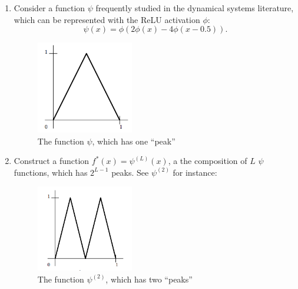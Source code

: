 \begin{enumerate}
\item
Consider a function $\psi$ frequently studied in the dynamical systems literature,
which can be represented with the ReLU activation $\phi$:
\[
\psi(x)=\phi(2\phi(x) - 4\phi(x-0.5)).
\]
\begin{figure}[H]
\centering
\includegraphics[width=0.4\textwidth]{Seventh_lecture/f_2.png}
\caption{The function $\psi$, which has one ``peak''}
\end{figure}
\item
Construct a function $f^*(x) = \psi^{(L)}(x)$, a the composition of $L$ $\psi$ functions, which has $2^{L-1}$ peaks. See $\psi^{(2)}$ for instance:
\begin{figure}[H]
\centering
\includegraphics[width=0.4\textwidth]{Seventh_lecture/f_3.png}
\caption{The function $\psi^{(2)}$, which has two ``peaks''}
\end{figure}
\end{enumerate}

